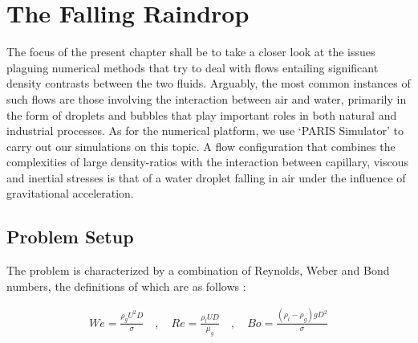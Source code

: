 \setchapterpreamble[u]{\margintoc}
\chapter{The Falling Raindrop}

The focus of the present chapter shall be to take a closer look at the issues 
plaguing numerical methods that try to deal with flows 
entailing significant density contrasts between the two fluids. 
Arguably, the most common instances of such flows are those involving the interaction
between air and water, primarily in the form of droplets and 
bubbles that play important roles in both natural and industrial processes. 
As for the numerical platform, we use `PARIS Simulator' 
to carry out our simulations on this topic. 
A flow configuration that combines the complexities of large 
density-ratios with the interaction between capillary, viscous and 
inertial stresses is that of a water droplet falling in 
air under the influence of gravitational acceleration.

\section{Problem Setup}

The problem is characterized by a combination of Reynolds, 
Weber and Bond numbers, the definitions of which are as follows : 

\begin{align}
We=\frac{\rho_{g} U^2 D}{\sigma} \quad,\quad Re= \frac{\rho_{l} U D}{\mu_{g}} \quad,\quad Bo=\frac{\left(\rho_{l}-\rho_{g}\right) g D^2 }{\sigma}
\end{align}



